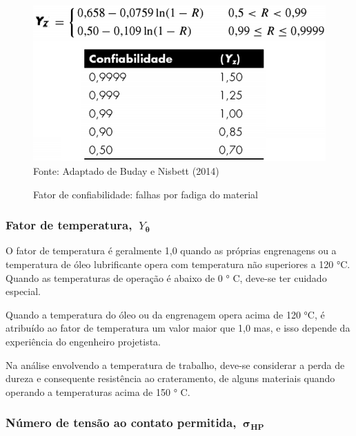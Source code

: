 \documentclass[12pt,a4paper]{article}
\begin{document}
\begin{figure}[!htb]
    \centering
    \caption{Fator de confiabilidade: falhas por fadiga do material}
    \includegraphics[scale=0.5]{Imagens/Img19.png}\\
    {\footnotesize Fonte: Adaptado de Buday e Nisbett (2014)}
    \label{fig:19}
\end{figure}

\subsubsection*{Fator de
temperatura,~\(Y_{\mathbf{\theta}}\)}

{\label{fator-de-temperatura-yux3b8}}

O fator de temperatura é geralmente 1,0 quando as próprias engrenagens
ou a temperatura de óleo lubrificante opera com temperatura não
superiores a 120 °C. Quando as temperaturas de operação é abaixo de 0 °
C, deve-se ter cuidado especial.

Quando a temperatura do óleo ou da engrenagem opera acima de 120 °C, é
atribuído ao fator de temperatura um valor maior que 1,0 mas, e
isso depende da experiência do engenheiro projetista.

Na análise envolvendo a temperatura de trabalho, deve-se considerar a
perda de dureza e consequente resistência ao crateramento, de alguns
materiais quando operando a temperaturas acima de 150 ° C.

\subsubsection*{Número de tensão ao contato
permitida,~\(\mathbf{\sigma}_{\mathbf{\text{HP}}}\)}

{\label{nuxfamero-de-tensuxe3o-ao-contato-permitida-mathbfsigma_mathbftexthp}}
\end{document}
